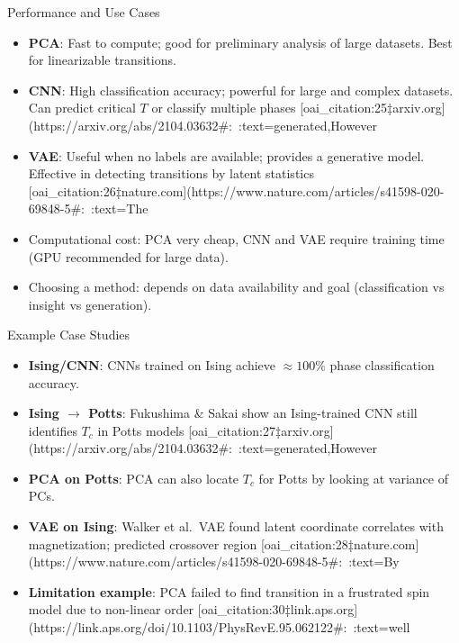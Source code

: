 \documentclass{beamer}
\begin{document}
\begin{frame}{Performance and Use Cases}
 \begin{itemize}
   \item \textbf{PCA}: Fast to compute; good for preliminary analysis of large datasets. Best for linearizable transitions.
   \item \textbf{CNN}: High classification accuracy; powerful for large and complex datasets. Can predict critical $T$ or classify multiple phases [oai_citation:25‡arxiv.org](https://arxiv.org/abs/2104.03632#:~:text=generated,However%
   \item \textbf{VAE}: Useful when no labels are available; provides a generative model. Effective in detecting transitions by latent statistics [oai_citation:26‡nature.com](https://www.nature.com/articles/s41598-020-69848-5#:~:text=The%
   \item Computational cost: PCA very cheap, CNN and VAE require training time (GPU recommended for large data).
   \item Choosing a method: depends on data availability and goal (classification vs insight vs generation).
 \end{itemize}
\end{frame}

\begin{frame}{Example Case Studies}
 \begin{itemize}
   \item \textbf{Ising/CNN}: CNNs trained on Ising achieve $\approx100\%$ phase classification accuracy.
   \item \textbf{Ising $\to$ Potts}: Fukushima \& Sakai show an Ising-trained CNN still identifies $T_c$ in Potts models [oai_citation:27‡arxiv.org](https://arxiv.org/abs/2104.03632#:~:text=generated,However%
   \item \textbf{PCA on Potts}: PCA can also locate $T_c$ for Potts by looking at variance of PCs.
   \item \textbf{VAE on Ising}: Walker et al.\ VAE found latent coordinate correlates with magnetization; predicted crossover region [oai_citation:28‡nature.com](https://www.nature.com/articles/s41598-020-69848-5#:~:text=By%
   \item \textbf{Limitation example}: PCA failed to find transition in a frustrated spin model due to non-linear order [oai_citation:30‡link.aps.org](https://link.aps.org/doi/10.1103/PhysRevE.95.062122#:~:text=well%
 \end{itemize}
\end{frame}
\end{document}
